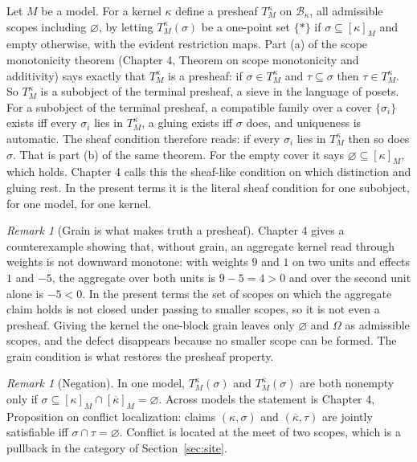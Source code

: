 \documentclass[11pt]{article}
\theoremstyle{plain}
\theoremstyle{definition}
\theoremstyle{remark}
\newtheorem{remark}[theorem]{Remark}
\newcommand{\Om}{\Omega}
\newcommand{\B}{\mathcal{B}}
\newcommand{\nk}[1]{\overline{#1}}
\begin{document}
Let $M$ be a model. For a kernel $\kappa$ define a presheaf $T^\kappa_M$ on $\B_\kappa$, all admissible scopes including $\varnothing$, by letting $T^\kappa_M(\sigma)$ be a one-point set $\{\ast\}$ if $\sigma\subseteq[\kappa]_M$ and empty otherwise, with the evident restriction maps. Part (a) of the scope monotonicity theorem (Chapter 4, Theorem on scope monotonicity and additivity) says exactly that $T^\kappa_M$ is a presheaf: if $\sigma\in T^\kappa_M$ and $\tau\subseteq\sigma$ then $\tau\in T^\kappa_M$. So $T^\kappa_M$ is a subobject of the terminal presheaf, a sieve in the language of posets. For a subobject of the terminal presheaf, a compatible family over a cover $\{\sigma_i\}$ exists iff every $\sigma_i$ lies in $T^\kappa_M$, a gluing exists iff $\sigma$ does, and uniqueness is automatic. The sheaf condition therefore reads: if every $\sigma_i$ lies in $T^\kappa_M$ then so does $\sigma$. That is part (b) of the same theorem. For the empty cover it says $\varnothing\subseteq[\kappa]_M$, which holds. Chapter 4 calls this the sheaf-like condition on which distinction and gluing rest. In the present terms it is the literal sheaf condition for one subobject, for one model, for one kernel.

\begin{remark}[Grain is what makes truth a presheaf]\label{rem:grain}
Chapter 4 gives a counterexample showing that, without grain, an aggregate kernel read through weights is not downward monotone: with weights $9$ and $1$ on two units and effects $1$ and $-5$, the aggregate over both units is $9-5=4>0$ and over the second unit alone is $-5<0$. In the present terms the set of scopes on which the aggregate claim holds is not closed under passing to smaller scopes, so it is not even a presheaf. Giving the kernel the one-block grain leaves only $\varnothing$ and $\Om$ as admissible scopes, and the defect disappears because no smaller scope can be formed. The grain condition is what restores the presheaf property.
\end{remark}

\begin{remark}[Negation]
In one model, $T^\kappa_M(\sigma)$ and $T^{\nk\kappa}_M(\sigma)$ are both nonempty only if $\sigma\subseteq[\kappa]_M\cap[\nk\kappa]_M=\varnothing$. Across models the statement is Chapter 4, Proposition on conflict localization: claims $(\kappa,\sigma)$ and $(\nk\kappa,\tau)$ are jointly satisfiable iff $\sigma\cap\tau=\varnothing$. Conflict is located at the meet of two scopes, which is a pullback in the category of Section~\ref{sec:site}.
\end{remark}
\end{document}
